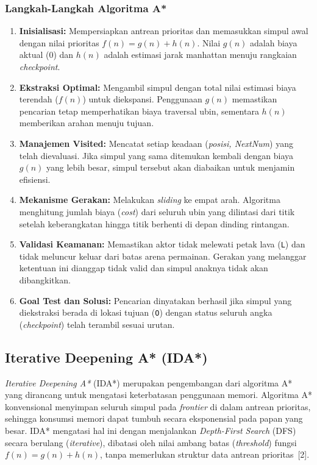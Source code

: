 \documentclass[12pt,a4paper]{article}
\begin{document}
\subsubsection{Langkah-Langkah Algoritma A*}
\begin{enumerate}
\item \textbf{Inisialisasi:} Mempersiapkan antrean prioritas dan memasukkan simpul awal dengan nilai prioritas $f(n) = g(n) + h(n)$. Nilai $g(n)$ adalah biaya aktual (0) dan $h(n)$ adalah estimasi jarak manhattan menuju rangkaian \textit{checkpoint}.
\item \textbf{Ekstraksi Optimal:} Mengambil simpul dengan total nilai estimasi biaya terendah ($f(n)$) untuk diekspansi. Penggunaan $g(n)$ memastikan pencarian tetap memperhatikan biaya traversal ubin, sementara $h(n)$ memberikan arahan menuju tujuan.
\item \textbf{Manajemen Visited:} Mencatat setiap keadaan (\textit{posisi, NextNum}) yang telah dievaluasi. Jika simpul yang sama ditemukan kembali dengan biaya $g(n)$ yang lebih besar, simpul tersebut akan diabaikan untuk menjamin efisiensi.
\item \textbf{Mekanisme Gerakan:} Melakukan \textit{sliding} ke empat arah. Algoritma menghitung jumlah biaya (\textit{cost}) dari seluruh ubin yang dilintasi dari titik setelah keberangkatan hingga titik berhenti di depan dinding rintangan.
\item \textbf{Validasi Keamanan:} Memastikan aktor tidak melewati petak lava (\texttt{L}) dan tidak meluncur keluar dari batas arena permainan. Gerakan yang melanggar ketentuan ini dianggap tidak valid dan simpul anaknya tidak akan dibangkitkan.
\item \textbf{Goal Test dan Solusi:} Pencarian dinyatakan berhasil jika simpul yang diekstraksi berada di lokasi tujuan (\texttt{O}) dengan status seluruh angka (\textit{checkpoint}) telah terambil sesuai urutan.
\end{enumerate}

\subsection{Iterative Deepening A* (IDA*)}
\textit{Iterative Deepening A*} (IDA*) merupakan pengembangan dari algoritma A*
yang dirancang untuk mengatasi keterbatasan penggunaan memori. Algoritma A*
konvensional menyimpan seluruh simpul pada \textit{frontier} di dalam antrean
prioritas, sehingga konsumsi memori dapat tumbuh secara eksponensial pada papan
yang besar. IDA* mengatasi hal ini dengan menjalankan \textit{Depth-First Search}
(DFS) secara berulang (\textit{iterative}), dibatasi oleh nilai ambang batas
(\textit{threshold}) fungsi $f(n) = g(n) + h(n)$, tanpa memerlukan struktur data
antrean prioritas~[2].
\end{document}
